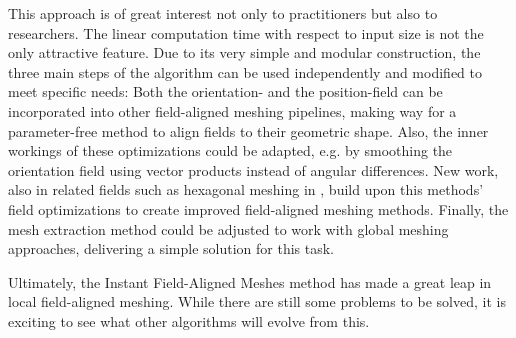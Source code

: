 \documentclass{ACGSeminar}
\begin{document}
This approach is of great interest not only to practitioners but also to researchers. The linear computation time with respect to input size is not the only attractive feature. Due to its very simple and modular construction, the three main steps of the algorithm can be used independently and modified to meet specific needs: Both the orientation- and the position-field can be incorporated into other field-aligned meshing pipelines, making way for a parameter-free method to align fields to their geometric shape. Also, the inner workings of these optimizations could be adapted, e.g. by smoothing the orientation field using vector products instead of angular differences. New work, also in related fields such as hexagonal meshing in \cite{gao2017robust}, build upon this methods' field optimizations to create improved field-aligned meshing methods. Finally, the mesh extraction method could be adjusted to work with global meshing approaches, delivering a simple solution for this task.\bigskip

Ultimately, the Instant Field-Aligned Meshes method has made a great leap in local field-aligned meshing. While there are still some problems to be solved, it is exciting to see what other algorithms will evolve from this.

\label{cha:references}
\printbibliography
\end{document}
